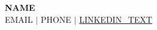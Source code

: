 \documentclass[letterpaper,11pt]{article}
\begin{document}
\begin{center}
    {\Large \textbf{{{NAME}}}} \\[4pt]
    \small
    {{EMAIL}}
    \hspace{6pt}$|$\hspace{6pt}
    {{PHONE}}
    \hspace{6pt}$|$\hspace{6pt}
    \href{{{LINKEDIN}}}{{{LINKEDIN_TEXT}}}
\end{center}

\vspace{8pt}


\vspace{8pt}

\end{document}
